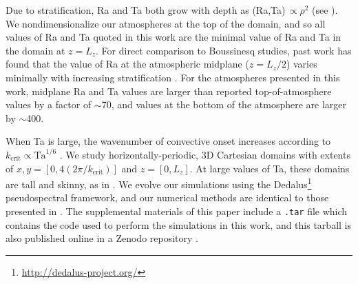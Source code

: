 Due to stratification, Ra and Ta both grow with depth as (Ra,Ta)$\, \propto \rho^2$ (see \AB).
We nondimensionalize our atmospheres at the top of the domain, and so all values of Ra and
Ta quoted in this work are the minimal value of Ra and Ta in the domain at $z = L_z$.
For direct comparison to Boussinesq studies, past work has found that the value of Ra 
at the atmospheric midplane ($z = L_z/2$) varies minimally with increasing stratification 
\citep{unnoetall1960}. For the atmospheres presented in this work, 
midplane Ra and Ta values
are larger than reported top-of-atmosphere values by a factor of $\sim$70, and values at the
bottom of the atmosphere are larger by $\sim$400.

When Ta is large, the wavenumber of convective onset increases according to $k_{\text{crit}} \propto \text{Ta}^{1/6}$
\citep{Chandrasekhar,calkins&all2015a}.
We study horizontally-periodic, 3D Cartesian domains with extents of
$x, y = [0, 4(2\pi/k_{\text{crit}})]$ and $z = [0, L_z]$. At large values of Ta, these
domains are tall and skinny, as in \cite{stellmach&all2014}.
We evolve our simulations using the Dedalus\footnote{\url{http://dedalus-project.org/}} 
pseudospectral framework, and our numerical methods are identical to those presented
in \AB. The supplemental materials of this paper include a \texttt{.tar} file which
contains the code used to perform the simulations in this work,
and this tarball is also published online in a Zenodo repository \citep{supp_andersetall2019a}.

